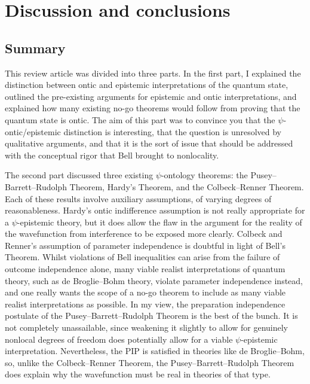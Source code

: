 \documentclass[DIV=calc,fontsize=12pt]{scrartcl} %
\theoremstyle{definition}
\theoremstyle{plain}
\begin{document}
\section{Discussion and conclusions}

\label{Conc}

\subsection{Summary}

This review article was divided into three parts.  In the first part,
I explained the distinction between ontic and epistemic
interpretations of the quantum state, outlined the pre-existing
arguments for epistemic and ontic interpretations, and explained how
many existing no-go theorems would follow from proving that the
quantum state is ontic.  The aim of this part was to convince you that
the $\psi$-ontic/epistemic distinction is interesting, that the
question is unresolved by qualitative arguments, and that it is the
sort of issue that should be addressed with the conceptual rigor that
Bell brought to nonlocality.

The second part discussed three existing $\psi$-ontology theorems: the
Pusey--Barrett--Rudolph Theorem, Hardy's Theorem, and the Colbeck--Renner Theorem.  Each of
these results involve auxiliary assumptions, of varying degrees of
reasonableness.  Hardy's ontic indifference assumption is not really
appropriate for a $\psi$-epistemic theory, but it does allow the flaw
in the argument for the reality of the wavefunction from interference
to be exposed more clearly.  Colbeck and Renner's assumption of
parameter independence is doubtful in light of Bell's Theorem.  Whilst
violations of Bell inequalities can arise from the failure of outcome
independence alone, many viable realist interpretations of quantum
theory, such as de Broglie--Bohm theory, violate parameter independence
instead, and one really wants the scope of a no-go theorem to include
as many viable realist interpretations as possible.  In my view, the
preparation independence postulate of the Pusey--Barrett--Rudolph Theorem is the best of
the bunch.  It is not completely unassailable, since weakening it
slightly to allow for genuinely nonlocal degrees of freedom does
potentially allow for a viable $\psi$-epistemic interpretation.
Nevertheless, the PIP is satisfied in theories like de Broglie--Bohm,
so, unlike the Colbeck--Renner Theorem, the Pusey--Barrett--Rudolph Theorem does explain
why the wavefunction must be real in theories of that type.
\end{document}
